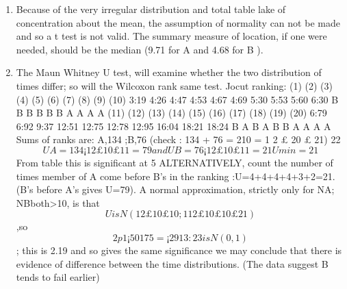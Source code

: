 \documentclass[a4paper,12pt]{article}
\begin{document}
\begin{enumerate}
\item 
Because of the very irregular distribution and total table lake of concentration
about the mean, the assumption of normality can not be made and so a t test is not
valid. The summary measure of location, if one were needed, should be the median
(9.71 for A and 4.68 for B ). 
\item The Maun Whitney U test, will examine whether the two
distribution of times differ; so will the Wilcoxon rank same test.
Jocut ranking:
(1) (2) (3) (4) (5) (6) (7) (8) (9) (10)
3:19 4:26 4:47 4:53 4:67 4:69 5:30 5:53 5:60 6:30
B B B B B B A A A A
(11) (12) (13) (14) (15) (16) (17) (18) (19) (20)
6:79 6:92 9:37 12:51 12:75 12:78 12:95 16:04 18:21 18:24
B A B A B B A A A A
Sums of ranks are: A,134 ;B,76 (check : 134 + 76 = 210 = 1
2 £ 20 £ 21)
22
\[UA = 134 ¡
1
2
£ 10 £ 11 = 79 and UB = 76 ¡
1
2
£ 10 £ 11 = 21 Umin = 21\]
From table this is significant at 5%
ALTERNATIVELY, count the number of times member of A come before B’s in the
ranking :U=4+4+4+4+3+2=21.(B’s before A’s gives U=79). A normal approximation,
strictly only for NA; NBboth>10, is that \[U is N( 1
2 £ 10 £ 10; 1
12 £ 10 £ 10 £ 21)\],so
\[2p1¡50
175 = ¡ 29
13:23 is N(0,1)\]; this is 2.19 and so gives the same significance
we may conclude that there is evidence of difference between the time distributions.
(The data suggest B tends to fail earlier)
\end{enumerate}
\end{document}
